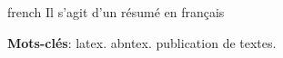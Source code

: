 \begin{resumo}[Résumé]
	\begin{otherlanguage*}{french}
		Il s'agit d'un résumé en français
		
		\vspace{\onelineskip}
		\noindent
		\textbf{Mots-clés}: latex. abntex. publication de textes.
		
	\end{otherlanguage*}
\end{resumo}